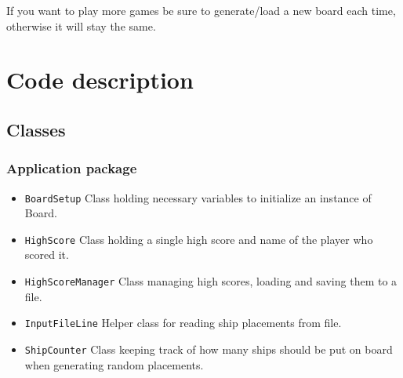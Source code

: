 \documentclass[]{article}
\begin{document}
If you want to play more games be sure to generate/load a new board each time, otherwise it will stay the same.
\newpage

\section{Code description}

\subsection{Classes}
\subsubsection{Application package}
\begin{itemize}
	\itemsep0em 
	\item \texttt{BoardSetup} Class holding necessary variables to initialize an instance of Board.
	\item \texttt{HighScore} Class holding a single high score and name of the player who scored it.
	\item \texttt{HighScoreManager} Class managing high scores, loading and saving them to a file.
	\item \texttt{InputFileLine} Helper class for reading ship placements from file.
	\item \texttt{ShipCounter} Class keeping track of how many ships should be put on board when generating random placements.
\end{itemize}
\end{document}
